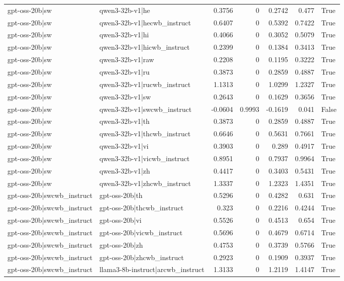 \begin{table}
\begin{tabular}{l l r r r r l}
gpt-oss-20b|sw & qwen3-32b-v1|he & 0.3756 & 0 & 0.2742 & 0.477 & True \\
gpt-oss-20b|sw & qwen3-32b-v1|hecwb_instruct & 0.6407 & 0 & 0.5392 & 0.7422 & True \\
gpt-oss-20b|sw & qwen3-32b-v1|hi & 0.4066 & 0 & 0.3052 & 0.5079 & True \\
gpt-oss-20b|sw & qwen3-32b-v1|hicwb_instruct & 0.2399 & 0 & 0.1384 & 0.3413 & True \\
gpt-oss-20b|sw & qwen3-32b-v1|raw & 0.2208 & 0 & 0.1195 & 0.3222 & True \\
gpt-oss-20b|sw & qwen3-32b-v1|ru & 0.3873 & 0 & 0.2859 & 0.4887 & True \\
gpt-oss-20b|sw & qwen3-32b-v1|rucwb_instruct & 1.1313 & 0 & 1.0299 & 1.2327 & True \\
gpt-oss-20b|sw & qwen3-32b-v1|sw & 0.2643 & 0 & 0.1629 & 0.3656 & True \\
gpt-oss-20b|sw & qwen3-32b-v1|swcwb_instruct & -0.0604 & 0.9993 & -0.1619 & 0.041 & False \\
gpt-oss-20b|sw & qwen3-32b-v1|th & 0.3873 & 0 & 0.2859 & 0.4887 & True \\
gpt-oss-20b|sw & qwen3-32b-v1|thcwb_instruct & 0.6646 & 0 & 0.5631 & 0.7661 & True \\
gpt-oss-20b|sw & qwen3-32b-v1|vi & 0.3903 & 0 & 0.289 & 0.4917 & True \\
gpt-oss-20b|sw & qwen3-32b-v1|vicwb_instruct & 0.8951 & 0 & 0.7937 & 0.9964 & True \\
gpt-oss-20b|sw & qwen3-32b-v1|zh & 0.4417 & 0 & 0.3403 & 0.5431 & True \\
gpt-oss-20b|sw & qwen3-32b-v1|zhcwb_instruct & 1.3337 & 0 & 1.2323 & 1.4351 & True \\
gpt-oss-20b|swcwb_instruct & gpt-oss-20b|th & 0.5296 & 0 & 0.4282 & 0.631 & True \\
gpt-oss-20b|swcwb_instruct & gpt-oss-20b|thcwb_instruct & 0.323 & 0 & 0.2216 & 0.4244 & True \\
gpt-oss-20b|swcwb_instruct & gpt-oss-20b|vi & 0.5526 & 0 & 0.4513 & 0.654 & True \\
gpt-oss-20b|swcwb_instruct & gpt-oss-20b|vicwb_instruct & 0.5696 & 0 & 0.4679 & 0.6714 & True \\
gpt-oss-20b|swcwb_instruct & gpt-oss-20b|zh & 0.4753 & 0 & 0.3739 & 0.5766 & True \\
gpt-oss-20b|swcwb_instruct & gpt-oss-20b|zhcwb_instruct & 0.2923 & 0 & 0.1909 & 0.3937 & True \\
gpt-oss-20b|swcwb_instruct & llama3-8b-instruct|arcwb_instruct & 1.3133 & 0 & 1.2119 & 1.4147 & True \\

\end{tabular}
\end{table}
